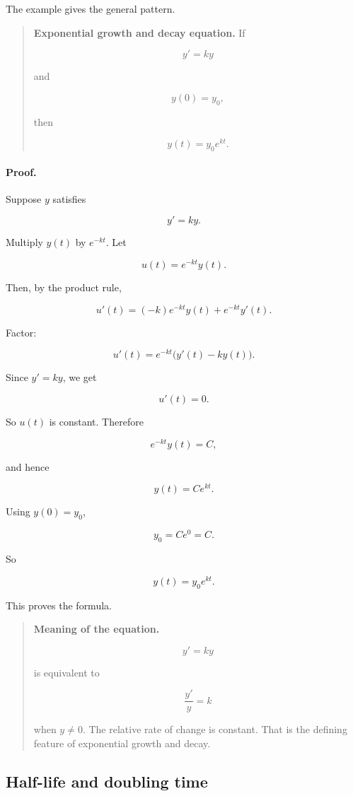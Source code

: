 The example gives the general pattern.

\begin{quote}
\textbf{Exponential growth and decay equation.}
If

\[
y'=ky
\]

and

\[
y(0)=y_0,
\]

then

\[
\boxed{
y(t)=y_0e^{kt}.
}
\]
\end{quote}

\paragraph{Proof.}
Suppose \(y\) satisfies

\[
y'=ky.
\]

Multiply \(y(t)\) by \(e^{-kt}\).  Let

\[
u(t)=e^{-kt}y(t).
\]

Then, by the product rule,

\[
u'(t)
=
(-k)e^{-kt}y(t)+e^{-kt}y'(t).
\]

Factor:

\[
u'(t)=e^{-kt}\bigl(y'(t)-ky(t)\bigr).
\]

Since \(y'=ky\), we get

\[
u'(t)=0.
\]

So \(u(t)\) is constant.  Therefore

\[
e^{-kt}y(t)=C,
\]

and hence

\[
y(t)=Ce^{kt}.
\]

Using \(y(0)=y_0\),

\[
y_0=Ce^0=C.
\]

So

\[
y(t)=y_0e^{kt}.
\]

This proves the formula.

\begin{quote}
\textbf{Meaning of the equation.}

\[
y'=ky
\]

is equivalent to

\[
\frac{y'}{y}=k
\]

when \(y\neq0\).  The relative rate of change is constant.  That is the defining
feature of exponential growth and decay.
\end{quote}

\subsection{Half-life and doubling time}
\label{subsec:half-life-doubling-time}

